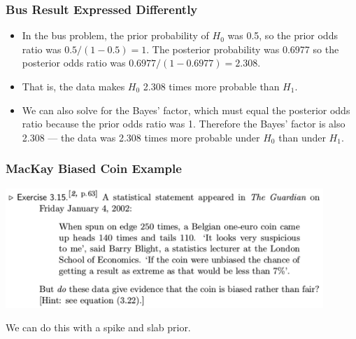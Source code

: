 \documentclass{beamer}
\begin{document}
\begin{frame}
\frametitle{Bus Result Expressed Differently}
\begin{itemize}
\item In the bus problem, the prior probability of $H_0$ was 0.5, so the prior
odds ratio was $0.5/(1 - 0.5) = 1$. The posterior probability was
0.6977 so the posterior odds ratio was $0.6977/(1 - 0.6977)=2.308$.\pause
\item That is, the data makes $H_0$ 2.308 times more probable than $H_1$.\pause
\item We can also solve for the Bayes' factor, which must equal the posterior
odds ratio because the prior odds ratio was 1. Therefore the Bayes' factor
is also 2.308 --- the data was 2.308 times more probable under $H_0$ than
under $H_1$.
\end{itemize}


\end{frame}


\begin{frame}
\frametitle{MacKay Biased Coin Example}

\begin{center}
\includegraphics[width=0.9\textwidth]{images/mackay_coin.png}
\end{center}

We can do this with a spike and slab prior.

\end{frame}
\end{document}
